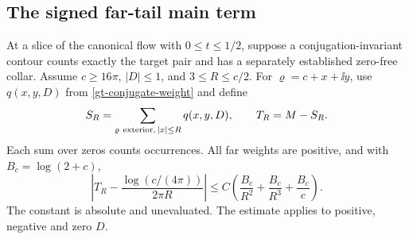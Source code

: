 \subsection{The signed far-tail main term}

\begin{theorem}
\label{gt-height-far}
At a slice of the canonical flow with \(0\le t\le1/2\), suppose a
conjugation-invariant contour counts exactly the target pair and
has a separately established zero-free collar. Assume \(c\ge16\pi\),
\(|D|\le1\), and \(3\le R\le c/2\). For \(\varrho=c+x+\ii y\),
use \(q(x,y,D)\) from \eqref{gt-conjugate-weight} and define
\begin{equation}
 S_R=\sum_{\varrho\ {\rm exterior},\,|x|\le R}q(x,y,D),
 \qquad T_R=M-S_R .
 \label{gt-height-signed-split}
\end{equation}
Each sum over zeros counts occurrences. All far weights are
positive, and with \(B_c=\log(2+c)\),
\begin{equation}
 \left|T_R-\frac{\log(c/(4\pi))}{2\pi R}\right|
 \le C\left(\frac{B_c}{R^2}+\frac{B_c}{R^3}+\frac{B_c}{c}\right).
 \label{gt-height-tail-estimate}
\end{equation}
The constant is absolute and unevaluated. The estimate applies to
positive, negative and zero \(D\). \cite{gtfar}
\end{theorem}
